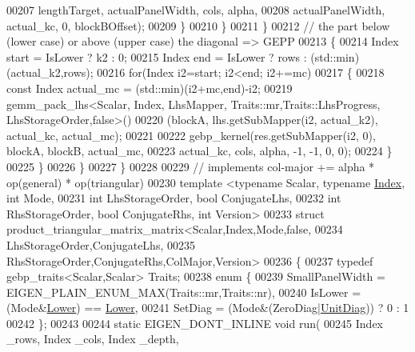 \begin{DoxyCode}
00207                         lengthTarget, actualPanelWidth, cols, alpha,
00208                         actualPanelWidth, actual\_kc, 0, blockBOffset);
00209           \}
00210         \}
00211       \}
00212       \textcolor{comment}{// the part below (lower case) or above (upper case) the diagonal => GEPP}
00213       \{
00214         Index start = IsLower ? k2 : 0;
00215         Index end   = IsLower ? rows : (std::min)(actual\_k2,rows);
00216         \textcolor{keywordflow}{for}(Index i2=start; i2<end; i2+=mc)
00217         \{
00218           \textcolor{keyword}{const} Index actual\_mc = (std::min)(i2+mc,end)-i2;
00219           gemm\_pack\_lhs<Scalar, Index, LhsMapper, Traits::mr,Traits::LhsProgress, LhsStorageOrder,false>()
00220             (blockA, lhs.getSubMapper(i2, actual\_k2), actual\_kc, actual\_mc);
00221 
00222           gebp\_kernel(res.getSubMapper(i2, 0), blockA, blockB, actual\_mc,
00223                       actual\_kc, cols, alpha, -1, -1, 0, 0);
00224         \}
00225       \}
00226     \}
00227   \}
00228 
00229 \textcolor{comment}{// implements col-major += alpha * op(general) * op(triangular)}
00230 \textcolor{keyword}{template} <\textcolor{keyword}{typename} Scalar, \textcolor{keyword}{typename} \hyperlink{namespace_eigen_a62e77e0933482dafde8fe197d9a2cfde}{Index}, \textcolor{keywordtype}{int} Mode,
00231           \textcolor{keywordtype}{int} LhsStorageOrder, \textcolor{keywordtype}{bool} ConjugateLhs,
00232           \textcolor{keywordtype}{int} RhsStorageOrder, \textcolor{keywordtype}{bool} ConjugateRhs, \textcolor{keywordtype}{int} Version>
00233 \textcolor{keyword}{struct }product\_triangular\_matrix\_matrix<Scalar,Index,Mode,false,
00234                                         LhsStorageOrder,ConjugateLhs,
00235                                         RhsStorageOrder,ConjugateRhs,ColMajor,Version>
00236 \{
00237   \textcolor{keyword}{typedef} gebp\_traits<Scalar,Scalar> Traits;
00238   \textcolor{keyword}{enum} \{
00239     SmallPanelWidth   = EIGEN\_PLAIN\_ENUM\_MAX(Traits::mr,Traits::nr),
00240     IsLower = (Mode&\hyperlink{group__enums_gga39e3366ff5554d731e7dc8bb642f83cda891792b8ed394f7607ab16dd716f60e6}{Lower}) == \hyperlink{group__enums_gga39e3366ff5554d731e7dc8bb642f83cda891792b8ed394f7607ab16dd716f60e6}{Lower},
00241     SetDiag = (Mode&(ZeroDiag|\hyperlink{group__enums_gga39e3366ff5554d731e7dc8bb642f83cdaddb72f888ac85d5a1c52333e54f9374b}{UnitDiag})) ? 0 : 1
00242   \};
00243 
00244   \textcolor{keyword}{static} EIGEN\_DONT\_INLINE \textcolor{keywordtype}{void} run(
00245     Index \_rows, Index \_cols, Index \_depth,

\end{DoxyCode}
